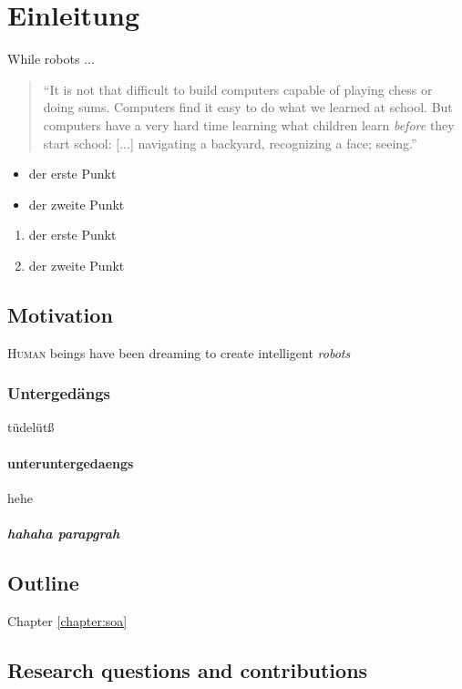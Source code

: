 \chapter{Einleitung}
\ifpdf
    \graphicspath{{1_introduction/figures/PNG/}{1_einleitung/figures/PDF/}{1_einleitung/figures/}}
\else
    \graphicspath{{1_einleitung/figures/EPS/}{1_einleitung/figures/}}
\fi



While robots ...

\begin{quote}
``It is not that difficult to build computers capable of playing chess or doing sums. Computers find it easy to do what we learned at school. But computers have a very hard time learning what children learn \textit{before} they start school: [...] navigating a backyard, recognizing a face; seeing.'' 
\end{quote}

\begin{itemize}
\item der erste Punkt
\item der zweite Punkt
\end{itemize}

\begin{enumerate}
\item der erste Punkt
\item der zweite Punkt
\end{enumerate}

\section{Motivation} %
\lettrine{H}{uman} beings have been dreaming to create intelligent \emph{robots} 

\subsection{Untergedängs}
tüdelütß

\subsubsection{unteruntergedaengs}
hehe

\paragraph{hahaha parapgrah}

\section{Outline}

Chapter \ref{chapter:soa} 

\section{Research questions and contributions}
\label{sec:introduction:contributions}

\newpage\thispagestyle{empty}
